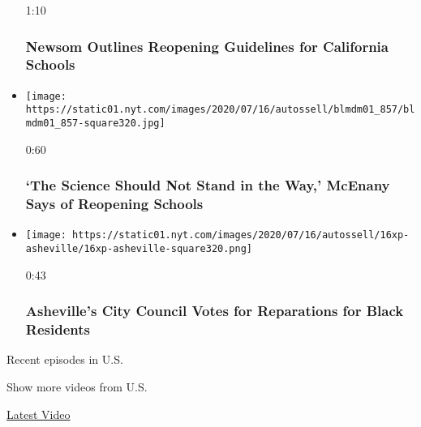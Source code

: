 \begin{itemize}
  1:10

  \hypertarget{newsom-outlines-reopening-guidelines-for-california-schools}{%
  \subsubsection{Newsom Outlines Reopening Guidelines for California
  Schools}\label{newsom-outlines-reopening-guidelines-for-california-schools}}
\item
  \href{https://www.nytimes.com/video/us/100000007243015/mcenany-trump-coronavirus-schools-science.html?action=click\&module=video-series-bar\&region=header\&pgtype=Article\&playlistId=video/u-s}{}

  \texttt{[image: https://static01.nyt.com/images/2020/07/16/autossell/blmdm01\_857/blmdm01\_857-square320.jpg]}

  0:60

  \hypertarget{the-science-should-not-stand-in-the-way-mcenany-says-of-reopening-schools}{%
  \subsubsection{`The Science Should Not Stand in the Way,' McEnany Says
  of Reopening
  Schools}\label{the-science-should-not-stand-in-the-way-mcenany-says-of-reopening-schools}}
\item
  \href{https://www.nytimes.com/video/us/100000007242196/asheville-reparations-north-carolina.html?action=click\&module=video-series-bar\&region=header\&pgtype=Article\&playlistId=video/u-s}{}

  \texttt{[image: https://static01.nyt.com/images/2020/07/16/autossell/16xp-asheville/16xp-asheville-square320.png]}

  0:43

  \hypertarget{ashevilles-city-council-votes-for-reparations-for-black-residents}{%
  \subsubsection{Asheville's City Council Votes for Reparations for
  Black
  Residents}\label{ashevilles-city-council-votes-for-reparations-for-black-residents}}
\end{itemize}

Recent episodes in U.S.

Show more videos from U.S.

\href{/video}{}

\href{/video/latest-video}{Latest Video}

